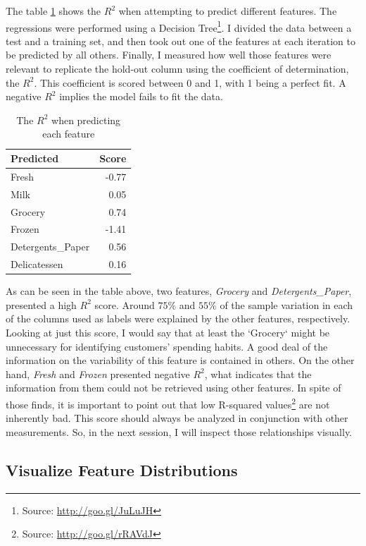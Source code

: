 \documentclass[a4paper]{article}
\begin{document}
The table  \ref{tab:r2} shows the $R^{2}$ when attempting to predict different features. The regressions were performed using a Decision Tree\footnote{Source: \url{http://goo.gl/JuLuJH}}. I divided the data between a test and a training set, and then took out one of the features at each iteration to be predicted by all others. Finally, I measured how well those features were relevant to replicate the hold-out column using the coefficient of determination, the $R^{2}$. This coefficient is scored between 0 and 1, with 1 being a perfect fit. A negative $R^2$ implies the model fails to fit the data.

\begin{table}[ht!]
\centering
\begin{tabular}{l|r}
{Predicted} &  Score \\\hline
Fresh            &  -0.77 \\
Milk             &   0.05 \\
Grocery          &   0.74 \\
Frozen           &  -1.41 \\
Detergents\_Paper &   0.56 \\
Delicatessen     &   0.16 \\

\end{tabular}
\caption{\label{tab:r2}The $R^{2}$ when predicting each feature}
\end{table}

As can be seen in the table above, two features, \textit{Grocery} and \textit{Detergents\_Paper}, presented a high $R^2$ score. Around $75$\% and $55$\% of the sample variation in each of the columns used as labels were explained by the other features, respectively. Looking at just this score, I would say that at least the `Grocery` might be unnecessary for identifying customers' spending habits. A good deal of the information on the variability of this feature is contained in others. On the other hand, \textit{Fresh} and \textit{Frozen} presented negative $R^2$, what indicates that the information from them could not be retrieved using other features. In spite of those finds, it is important to point out that low R-squared values\footnote{Source: \url{http://goo.gl/rRAVdJ}} are not inherently bad. This score should always be analyzed in conjunction with other measurements. So, in the next session, I will inspect those relationships visually.


\subsection{Visualize Feature Distributions}
\end{document}
